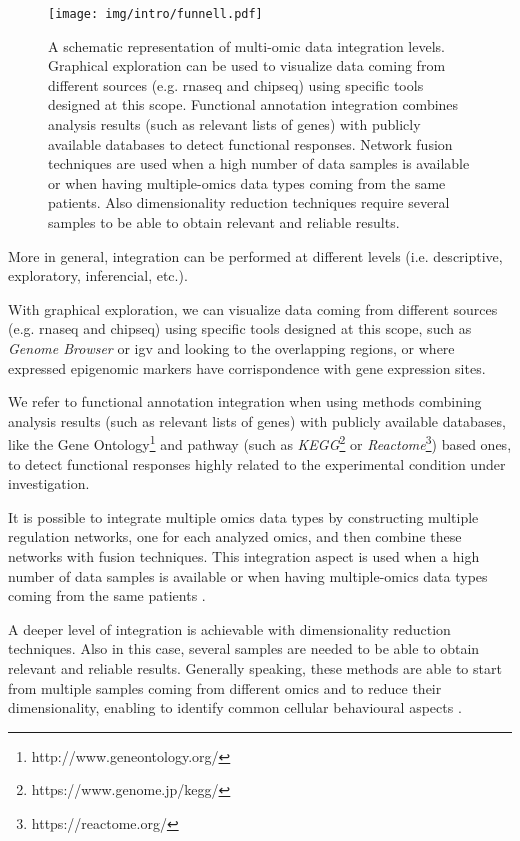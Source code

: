 \begin{figure}[h]
\centering
\texttt{[image: img/intro/funnell.pdf]}
\caption[Integration Funnell]{A schematic representation of multi-omic data integration levels.
Graphical exploration can be used to visualize data coming from different sources (e.g. \gls{rnaseq} and \gls{chipseq}) using specific tools designed at this scope.
Functional annotation integration combines analysis results (such as relevant lists of genes) with publicly available databases to detect functional responses.
Network fusion techniques are used when a high number of data samples is available or when having multiple-omics data types coming from the same patients.
Also dimensionality reduction techniques require several samples to be able to obtain relevant and reliable results.
}
\label{fig:funnell}
\end{figure}

More in general, integration can be performed at different levels (i.e. descriptive, exploratory, inferencial, etc.).

With graphical exploration, we can visualize data coming from different sources (e.g. \gls{rnaseq} and \gls{chipseq}) using specific tools designed at this scope, such as \textit{Genome Browser} \cite{Karolchik2011} or \gls{igv} \cite{Robinson2011, Thorvaldsdottir2013} and looking to the overlapping regions, or where expressed epigenomic markers have corrispondence with gene expression sites.

We refer to functional annotation integration when using methods combining analysis results (such as relevant lists of genes) with publicly available databases,  like the Gene Ontology\footnote{http://www.geneontology.org/} and pathway (such as \textit{KEGG}\footnote{https://www.genome.jp/kegg/} or \textit{Reactome}\footnote{https://reactome.org/}) based ones, to detect functional responses highly related to the experimental condition under investigation.

It is possible to integrate multiple omics data types by constructing multiple regulation networks, one for each analyzed omics, and then combine these networks with fusion techniques.
This integration aspect is used when a high number of data samples is available or when having multiple-omics data types coming from the same patients \cite{Wang2014}.

A deeper level of integration is achievable with dimensionality reduction techniques. 
Also in this case, several samples are needed to be able to obtain relevant and reliable results.
Generally speaking, these methods are able to start from multiple samples coming from different omics and to reduce their dimensionality, enabling to identify common cellular behavioural aspects \cite{Rohart2017, Argelaguet2018}.



